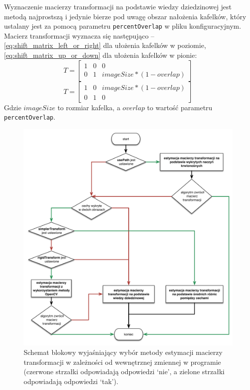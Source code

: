 Wyznaczenie macierzy transformacji na podstawie wiedzy dziedzinowej jest metodą najprostszą i jedynie bierze pod uwagę obszar nałożenia kafelków, który ustalany jest za pomocą parametru \texttt{percentOverlap} w pliku konfiguracyjnym. Macierz transformacji wyznacza się następująco -- \ref{eq:shift_matrix_left_or_right} dla ułożenia kafelków w poziomie, \ref{eq:shift_matrix_up_or_down} dla ułożenia kafelków w pionie:
\begin{equation}
T = \begin{bmatrix}
  1 & 0 & 0 \\
  0 & 1 & imageSize * (1 - overlap)
\end{bmatrix}
\label{eq:shift_matrix_up_or_down}
\end{equation}
\begin{equation}
T = \begin{bmatrix}
  1 & 0 & imageSize * (1 - overlap) \\
  0 & 1 & 0
\end{bmatrix}
\label{eq:shift_matrix_left_or_right}
\end{equation}
Gdzie $imageSize$ to rozmiar kafelka, a $overlap$ to wartość parametru \texttt{percentOverlap}.

\begin{figure}[H]
  \centering
  \includegraphics[width=\textwidth]{gfx/decision_model}
  \caption{Schemat blokowy wyjaśniający wybór metody estymacji macierzy transformacji w zależności od wewnętrznej zmiennej w programie (czerwone strzałki odpowiadają odpowiedzi `nie', a zielone strzałki odpowiadają odpowiedzi `tak').}
  \label{fig:proponowane_algorytmy:decision_model}
\end{figure}

